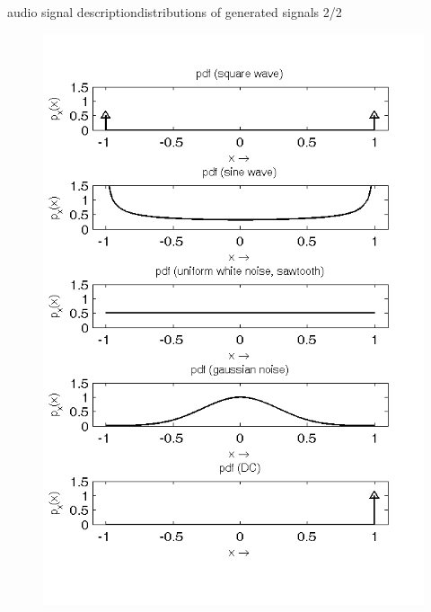 \begin{frame}{audio signal description}{distributions of generated signals 2/2}
    \vspace{-5mm}
	\begin{figure}
		\centering
			\includegraphics[scale=.5]{graph/pdfs}
	\end{figure}
\end{frame}	

